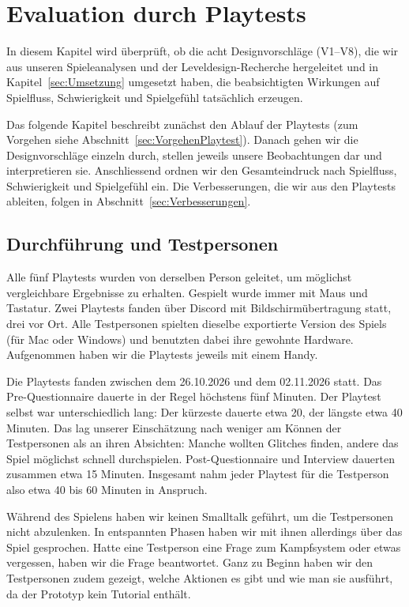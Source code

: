 \documentclass[../Main.tex]{subfiles}
\begin{document}
\section{Evaluation durch Playtests} \label{sec:Evaluation}

In diesem Kapitel wird überprüft, ob die acht Designvorschläge (V1--V8), die wir aus unseren Spieleanalysen und der Leveldesign-Recherche hergeleitet und in Kapitel~\ref{sec:Umsetzung} umgesetzt haben, die beabsichtigten Wirkungen auf Spielfluss, Schwierigkeit und Spielgefühl tatsächlich erzeugen.

Das folgende Kapitel beschreibt zunächst den Ablauf der Playtests (zum Vorgehen siehe Abschnitt~\ref{sec:VorgehenPlaytest}). Danach gehen wir die Designvorschläge einzeln durch, stellen jeweils unsere Beobachtungen dar und interpretieren sie. Anschliessend ordnen wir den Gesamteindruck nach Spielfluss, Schwierigkeit und Spielgefühl ein. Die Verbesserungen, die wir aus den Playtests ableiten, folgen in Abschnitt~\ref{sec:Verbesserungen}.

\subsection{Durchführung und Testpersonen} \label{sec:Durchfuehrung}

Alle fünf Playtests wurden von derselben Person geleitet, um möglichst vergleichbare Ergebnisse zu erhalten. Gespielt wurde immer mit Maus und Tastatur. Zwei Playtests fanden über Discord mit Bildschirmübertragung statt, drei vor Ort. Alle Testpersonen spielten dieselbe exportierte Version des Spiels (für Mac oder Windows) und benutzten dabei ihre gewohnte Hardware. Aufgenommen haben wir die Playtests jeweils mit einem Handy.

Die Playtests fanden zwischen dem 26.10.2026 und dem 02.11.2026 statt. Das Pre-Questionnaire dauerte in der Regel höchstens fünf Minuten. Der Playtest selbst war unterschiedlich lang: Der kürzeste dauerte etwa 20, der längste etwa 40 Minuten. Das lag unserer Einschätzung nach weniger am Können der Testpersonen als an ihren Absichten: Manche wollten Glitches finden, andere das Spiel möglichst schnell durchspielen. Post-Questionnaire und Interview dauerten zusammen etwa 15 Minuten. Insgesamt nahm jeder Playtest für die Testperson also etwa 40 bis 60 Minuten in Anspruch.

Während des Spielens haben wir keinen Smalltalk geführt, um die Testpersonen nicht abzulenken. In entspannten Phasen haben wir mit ihnen allerdings über das Spiel gesprochen. Hatte eine Testperson eine Frage zum Kampfsystem oder etwas vergessen, haben wir die Frage beantwortet. Ganz zu Beginn haben wir den Testpersonen zudem gezeigt, welche Aktionen es gibt und wie man sie ausführt, da der Prototyp kein Tutorial enthält.
\end{document}

